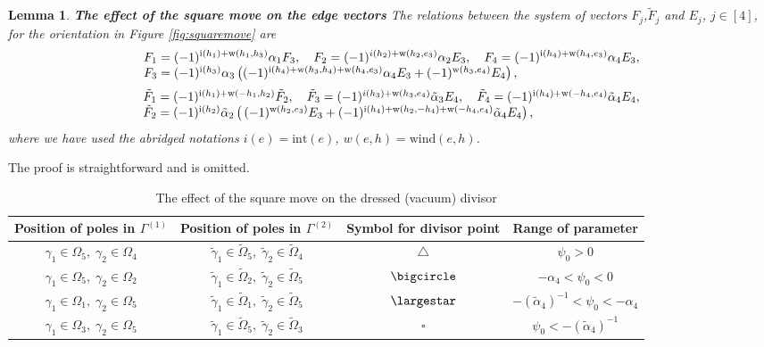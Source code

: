\documentclass[11pt]{amsart}
\theoremstyle{plain}
\numberwithin{equation}{section}
\newtheorem{lemma}[theorem]{Lemma}
\def \i {\mbox{\scriptsize{i}}}
\def \w {\mbox{\scriptsize{w}}}
\begin{document}
\begin{lemma}\label{lem:square_edge_vectors}\textbf{The effect of the square move on the edge vectors}
The relations between the system of vectors $F_j$,${\tilde F}_j$ and $E_j$, $j\in [4]$, for the orientation in Figure \ref{fig:squaremove} are
\begin{equation}\label{eq:move1}
\begin{array}{l}
\displaystyle F_1 = (-1)^{\i(h_1)+\w(h_1,h_3)} \alpha_1 F_3, \quad F_2 = (-1)^{i(h_2)+\w(h_2,e_3)} \alpha_2E_3,\quad F_4 = (-1)^{\i(h_4)+\w(h_4,e_3)} \alpha_4 E_3,
\\
F_3 = (-1)^{\i(h_3)} \alpha_3 \left( (-1)^{\i(h_4)+\w(h_3,h_4)+\w(h_4,e_3)}\alpha_4 E_3 + (-1)^{\w(h_3,e_4)} E_4  \right),
\end{array}
\end{equation}
\begin{equation}\label{eq:move2}
\begin{array}{l}
{\tilde F}_1 =  (-1)^{\i(h_1)+\w(-h_1,h_2)} {\tilde F}_2, \quad {\tilde F}_3 =  (-1)^{i(h_3)+\w(h_3,e_4)} {\tilde \alpha}_3 E_4, \quad {\tilde F}_4 =  (-1)^{\i(h_4)+\w(-h_4,e_4)} {\tilde \alpha}_4 E_4, \\
{\tilde F}_2 =  (-1)^{\i(h_2)} {\tilde \alpha}_2 \left( \,  (-1)^{\w(h_2,e_3)} E_3 + (-1)^{\i(h_4)+\w(h_2,-h_4)+\w(-h_4,e_4)} {\tilde \alpha}_4  E_4  \right),
\end{array}
\end{equation}
where we have used the abridged notations $i(e)=\mbox{int}(e)$, $w(e,h)=\mbox{wind}(e,h)$.
\end{lemma}

The proof is straightforward and is omitted.
\begin{table}
\caption{The effect of the square move on the dressed (vacuum) divisor} 
\centering
\begin{tabular}{|c|c|c|c|}
\hline\hline
Position of poles in $\Gamma^{(1)}$ & Position of poles in $\Gamma^{(2)}$ & Symbol for divisor point & Range of parameter\\[0.5ex]
\hline
$\gamma_1 \in \Omega_5, \;  \gamma_2 \in \Omega_4$    
& ${\tilde \gamma}_1 \in {\tilde \Omega}_5, \;  {\tilde \gamma}_2 \in {\tilde \Omega}_4$ & $\triangle$ & $\psi_0 > 0$\\
$\gamma_1 \in \Omega_5, \;  \gamma_2 \in \Omega_2$    
& ${\tilde \gamma}_1 \in {\tilde \Omega}_2, \;  {\tilde \gamma}_2 \in {\tilde \Omega}_5$  
& $\bigcircle$   & $-\alpha_4 < \psi_0 < 0$\\
$\gamma_1 \in \Omega_1, \;  \gamma_2 \in \Omega_5$    
& ${\tilde \gamma}_1 \in {\tilde \Omega}_1, \;  {\tilde \gamma}_2 \in {\tilde \Omega}_5$ 
& $\largestar$  & $- ({\tilde \alpha}_4)^{-1} < \psi_0 < -\alpha_4$\\
$\gamma_1 \in \Omega_3, \;  \gamma_2 \in \Omega_5$    
& ${\tilde \gamma}_1 \in {\tilde \Omega}_5, \;  {\tilde \gamma}_2 \in {\tilde \Omega}_3$   
& $\square$  & $\psi_0 < - ({\tilde \alpha}_4)^{-1}$\\[1ex]
\hline
\end{tabular}
\label{table:SM}
\end{table}
\end{document}
